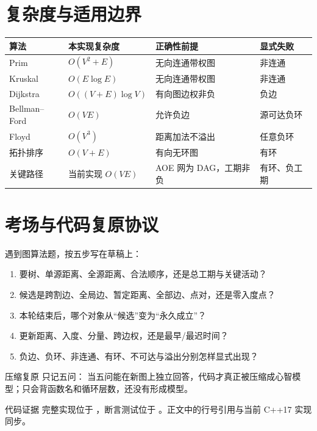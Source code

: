\documentclass[UTF8,fontset=none,11pt,a4paper]{ctexart}
\begin{document}
\section{复杂度与适用边界}

\begin{center}\small
\begin{tabularx}{\linewidth}{L{2.3cm}C{2.4cm}Y Y}
\toprule
算法 & 本实现复杂度 & 正确性前提 & 显式失败 \\
\midrule
Prim & $O(V^2+E)$ & 无向连通带权图 & 非连通 \\
Kruskal & $O(E\log E)$ & 无向连通带权图 & 非连通 \\
Dijkstra & $O((V+E)\log V)$ & 有向图边权非负 & 负边 \\
Bellman--Ford & $O(VE)$ & 允许负边 & 源可达负环 \\
Floyd & $O(V^3)$ & 距离加法不溢出 & 任意负环 \\
拓扑排序 & $O(V+E)$ & 有向无环图 & 有环 \\
关键路径 & 当前实现 $O(VE)$ & AOE 网为 DAG，工期非负 & 有环、负工期 \\
\bottomrule
\end{tabularx}
\end{center}

\section{考场与代码复原协议}

遇到图算法题，按五步写在草稿上：
\begin{enumerate}
  \item {}要树、单源距离、全源距离、合法顺序，还是总工期与关键活动？
  \item {}候选是跨割边、全局边、暂定距离、全部边、点对，还是零入度点？
  \item {}本轮结束后，哪个对象从“候选”变为“永久成立”？
  \item {}更新距离、入度、分量、跨边权，还是最早/最迟时间？
  \item {}负边、负环、非连通、有环、不可达与溢出分别怎样显式出现？
\end{enumerate}

\begin{corebox}{压缩复原}
只记五问：
当五问能在新图上独立回答，代码才真正被压缩成心智模型；只会背函数名和循环层数，还没有形成模型。
\end{corebox}

\begin{methodbox}{代码证据}
完整实现位于 ，断言测试位于
。正文中的行号引用与当前 C++17 实现同步。
\end{methodbox}
\end{document}
